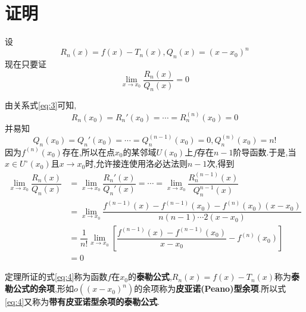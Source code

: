 \documentclass{ctexart}
\begin{document}
\section{证明}
设
\[R_{n}(x)=f(x)-T_{n}(x),Q_{n}(x)=(x-x_{0})^{n}\]
现在只要证
\[\lim_{x\to x_{0}}\dfrac{R_{n}(x)}{Q_{n}(x)}=0\]

由关系式\ref{eq:3}可知,
\[R_{n}(x_{0})=R_{n}'(x_{0})=\cdots=R_{n}^{(n)}(x_{0})=0\]
并易知
\[Q_{n}(x_{0})=Q_{n}'(x_{0})=\cdots=Q_{n}^{(n-1)}(x_{0})=0,Q_{n}^{(n)}(x_{0})=n!\]
因为$ f^{(n)}(x_{0}) $存在,所以在点$ x_{0} $的某邻域$ U(x_{0}) $上$ f $存在$ n-1 $阶导函数.于是,当$ x\in U^{\circ}(x_{0}) $且$ x\to x_{0} $时,允许接连使用洛必达法则$ n-1 $次,得到
\[
\begin{split}
	\lim_{x\to x_{0}}\dfrac{R_{n}(x)}{Q_{n}(x)}&=\lim_{x\to x_{0}}\dfrac{R_{n}'(x)}{Q_{n}'(x)}=\cdots=\lim_{x\to x_{0}}\dfrac{R_{n}^{(n-1)}(x)}{Q_{n}^{n-1}(x)}\\
	&=\lim_{x\to x_{0}}\dfrac{f^{(n-1)}(x)-f^{(n-1)}(x_{0})-f^{(n)}(x_{0})(x-x_{0})}{n(n-1)\cdots2(x-x_{0})}\\
	&=\dfrac{1}{n!}\lim_{x\to x_{0}}[\dfrac{f^{(n-1)}(x)-f^{(n-1)}(x_{0})}{x-x_{0}}-f^{(n)}(x_{0})]\\
	&=0
\end{split}
\]

定理所证的式\ref{eq:4}称为函数$ f $在$ x_{0} $的\textbf{泰勒公式},$ R_{n}(x)=f(x)-T_{n}(x) $称为\textbf{泰勒公式的余项},形如$ o((x-x_{0})^{n}) $的余项称为\textbf{皮亚诺(Peano)型余项}.所以式\ref{eq:4}又称为\textbf{带有皮亚诺型余项的泰勒公式}.
\end{document}
